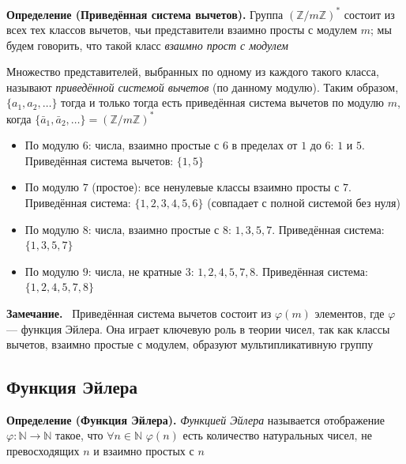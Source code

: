 \documentclass[a4paper,12pt]{article}
\newcommand{\myremark}{\textbf{Замечание.}\ }
\theoremstyle{definition}
\theoremstyle{plain}
\theoremstyle{remark}
\begin{document}
	\noindent \textbf{Определение (Приведённая система вычетов).}
	Группа $(\mathbb{Z}/m\mathbb{Z})^*$ состоит из всех тех классов вычетов, чьи представители взаимно просты с модулем $m$; мы будем говорить, что такой класс \textit{взаимно прост с модулем}
	
	Множество представителей, выбранных по одному из каждого такого класса, называют \textit{приведённой системой вычетов} (по данному модулю). Таким образом, $\{a_1, a_2, \dots\}$ тогда и только тогда есть приведённая система вычетов по модулю $m$, когда $\{\bar{a}_1, \bar{a}_2, \dots\} = (\mathbb{Z}/m\mathbb{Z})^*$
	
	\begin{tcolorbox}[colback=blue!5, colframe=blue!40!black, title=Примеры]
		\begin{itemize}
			\item По модулю $6$: числа, взаимно простые с $6$ в пределах от $1$ до $6$: $1$ и $5$. Приведённая система вычетов: $\{1, 5\}$
			\item По модулю $7$ (простое): все ненулевые классы взаимно просты с $7$. Приведённая система: $\{1,2,3,4,5,6\}$ (совпадает с полной системой без нуля)
			\item По модулю $8$: числа, взаимно простые с $8$: $1,3,5,7$. Приведённая система: $\{1,3,5,7\}$
			\item По модулю $9$: числа, не кратные $3$: $1,2,4,5,7,8$. Приведённая система: $\{1,2,4,5,7,8\}$
		\end{itemize}
	\end{tcolorbox}
	
	\myremark
	Приведённая система вычетов состоит из $\varphi(m)$ элементов, где $\varphi$ — функция Эйлера. Она играет ключевую роль в теории чисел, так как классы вычетов, взаимно простые с модулем, образуют мультипликативную группу
	
	\subsection{Функция Эйлера}
	
	\noindent \textbf{Определение (Функция Эйлера).}
	\textit{Функцией Эйлера} называется отображение $\varphi \colon \mathbb{N} \to \mathbb{N}$ такое, что $\forall n \in \mathbb{N}$ $\varphi(n)$ есть количество натуральных чисел, не превосходящих $n$ и взаимно простых с $n$
	
\end{document}
